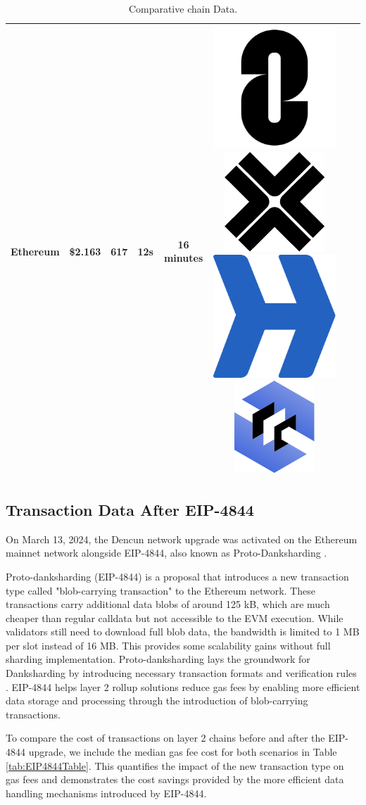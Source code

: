 \documentclass[fleqn,10pt]{olplainarticle}
\begin{document}
\begin{table}[H]
\begin{tabular}{|c|c|c|c|c|c|c|c|}
		Ethereum & \cellcolor[RGB]{255,0,0}\$2.163 & \cellcolor[RGB]{150,255,100}617 & \cellcolor[RGB]{255,0,0}12s  & \cellcolor[RGB]{255,50,0}16 minutes \cite{bnb_chain_coming_nodate} & \includegraphics[width=0.03\linewidth]{img/logoLayerZero} \includegraphics[width=0.03\linewidth]{img/logoAxelar}  \includegraphics[width=0.03\linewidth]{img/logoHyperlane} \includegraphics[width=0.03\linewidth]{img/logoCCIP} & & \\ \hline
		
	\end{tabular}
	\caption{Comparative chain Data.}
	\label{tab:TableChain}
\end{table}

\subsection{Transaction Data After EIP-4844}

On March 13, 2024, the Dencun network upgrade was activated on the Ethereum mainnet network alongside EIP-4844, also known as Proto-Danksharding \cite{protocol_support_team_dencun_2024}.

Proto-danksharding (EIP-4844) is a proposal that introduces a new transaction type called "blob-carrying transaction" to the Ethereum network. These transactions carry additional data blobs of around 125 kB, which are much cheaper than regular calldata but not accessible to the EVM execution. While validators still need to download full blob data, the bandwidth is limited to 1 MB per slot instead of 16 MB. This provides some scalability gains without full sharding implementation. Proto-danksharding lays the groundwork for Danksharding by introducing necessary transaction formats and verification rules \cite{buterin_proto-danksharding_nodate}.
EIP-4844 helps layer 2 rollup solutions reduce gas fees by enabling more efficient data storage and processing through the introduction of blob-carrying transactions.

To compare the cost of transactions on layer 2 chains before and after the EIP-4844 upgrade, we include the median gas fee cost for both scenarios in Table \ref{tab:EIP4844Table}. This quantifies the impact of the new transaction type on gas fees and demonstrates the cost savings provided by the more efficient data handling mechanisms introduced by EIP-4844.
\end{document}
